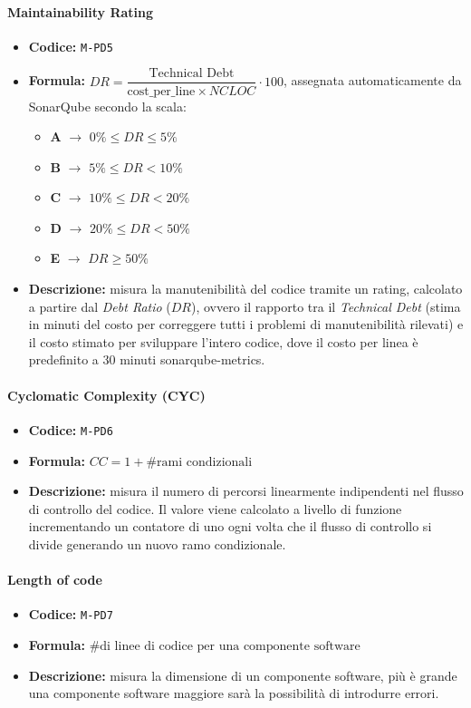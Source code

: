 \documentclass[a4paper,12pt]{article}
\begin{document}
\paragraph{Maintainability Rating}
\begin{itemize}
\item \textbf{Codice:} \texttt{M-PD5}
\item \textbf{Formula:} $DR = \dfrac{\text{Technical Debt}}{\text{cost\_per\_line} 
\times NCLOC} \cdot 100$, assegnata automaticamente da SonarQube secondo la scala:
\begin{itemize}
    \item \textbf{A} $\rightarrow$ $0\% \leq DR \leq 5\%$
    \item \textbf{B} $\rightarrow$ $5\% \leq DR < 10\%$
    \item \textbf{C} $\rightarrow$ $10\% \leq DR < 20\%$
    \item \textbf{D} $\rightarrow$ $20\% \leq DR < 50\%$
    \item \textbf{E} $\rightarrow$ $DR \geq 50\%$
\end{itemize}
\item \textbf{Descrizione:} misura la manutenibilità del codice tramite un rating, calcolato a partire dal 
\textit{Debt Ratio} ($DR$), ovvero il rapporto tra il \textit{Technical Debt} 
(stima in minuti del costo per correggere tutti i problemi di manutenibilità 
rilevati) e il costo stimato per sviluppare l'intero codice, dove il costo per 
linea è predefinito a 30 minuti sonarqube-metrics.
\end{itemize}

\paragraph{Cyclomatic Complexity (CYC)}
\begin{itemize}
    \item \textbf{Codice:} \texttt{M-PD6}
    \item \textbf{Formula:} $CC = 1 + \# \text{rami condizionali}$
    \item \textbf{Descrizione:} misura il numero di percorsi linearmente indipendenti 
nel flusso di controllo del codice. Il valore viene calcolato a livello di funzione 
incrementando un contatore di uno ogni volta che il flusso di controllo si divide 
generando un nuovo ramo condizionale.
\end{itemize}

\paragraph{Length of code}
\begin{itemize}
    \item \textbf{Codice:} \texttt{M-PD7}
    \item \textbf{Formula:} $\text{\# di linee di codice per una componente software}$
    \item \textbf{Descrizione:} misura la dimensione di un componente software, più è grande una componente software maggiore sarà la possibilità di introdurre errori.
\end{itemize}
\end{document}
